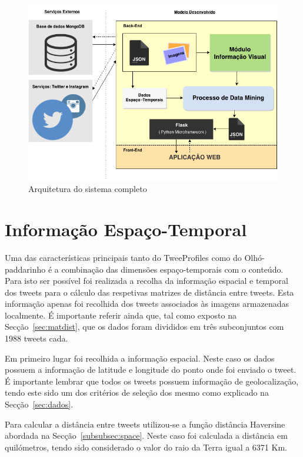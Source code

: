 \begin{figure}[h]
\centering
\includegraphics[width=1.0\linewidth]{./figures/arquitetura_sistema}
\caption{Arquitetura do sistema completo}
\label{fig:archsys}
\end{figure}


\section{Informação Espaço-Temporal} \label{sec:infoesptmp}

Uma das características principais tanto do TweeProfiles como do Olhó-paddarinho é a combinação das dimensões espaço-temporais com o conteúdo. Para isto ser possível foi realizada a recolha da informação espacial e temporal dos tweets para o cálculo das respetivas matrizes de distância entre tweets. Esta informação apenas foi recolhida dos tweets associados às imagens armazenadas localmente. É importante referir ainda que, tal como exposto na Secção~\ref{sec:matdist}, que os dados foram divididos em três subconjuntos com 1988 tweets cada.

Em primeiro lugar foi recolhida a informação espacial. Neste caso os dados possuem a informação de latitude e longitude do ponto onde foi enviado o tweet. É importante lembrar que todos os tweets possuem informação de geolocalização, tendo este sido um dos critérios de seleção dos mesmo como explicado na Secção~\ref{sec:dados}.

Para calcular a distância entre tweets utilizou-se a função distância Haversine abordada na Secção~\ref{subsubsec:space}. Neste caso foi calculada a distância em quilómetros, tendo sido considerado o valor do raio da Terra igual a 6371 Km.

